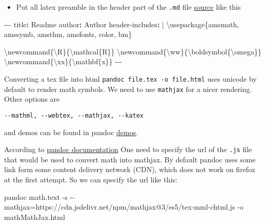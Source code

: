 \documentclass[
]{article}
\newenvironment{Shaded}{}{}
\newcommand{\AttributeTok}[1]{\textcolor[rgb]{0.49,0.56,0.16}{#1}}
\newcommand{\CharTok}[1]{\textcolor[rgb]{0.25,0.44,0.63}{#1}}
\newcommand{\ExtensionTok}[1]{#1}
\newcommand{\FunctionTok}[1]{\textcolor[rgb]{0.02,0.16,0.49}{#1}}
\newcommand{\KeywordTok}[1]{\textcolor[rgb]{0.00,0.44,0.13}{\textbf{#1}}}
\newcommand{\NormalTok}[1]{#1}
\newcommand{\OperatorTok}[1]{\textcolor[rgb]{0.40,0.40,0.40}{#1}}
\newcommand{\PreprocessorTok}[1]{\textcolor[rgb]{0.74,0.48,0.00}{#1}}
\providecommand{\tightlist}{%
  \setlength{\itemsep}{0pt}\setlength{\parskip}{0pt}}
\newcommand{\1}{\boldsymbol{1}}
\begin{document}
\begin{itemize}
\tightlist
\item
  Put all latex preamble in the header part of the \texttt{.md} file
  \href{https://pandoc.org/MANUAL.html\#extension-yaml_metadata_block}{source}
  like this
\end{itemize}

\begin{Shaded}
\begin{Highlighting}[]
\PreprocessorTok{{-}{-}{-}}
\FunctionTok{title}\KeywordTok{:}\AttributeTok{ Readme}
\FunctionTok{author}\KeywordTok{:}\AttributeTok{ Author}
\FunctionTok{header{-}includes}\KeywordTok{: }\CharTok{|}
\NormalTok{    \textbackslash{}usepackage\{amsmath, amssymb, amsthm, amsfonts, color, bm\}}

\NormalTok{    \textbackslash{}newcommand\{\textbackslash{}R\}\{\textbackslash{}mathcal\{R\}\}}
\NormalTok{    \textbackslash{}newcommand\{\textbackslash{}ww\}\{\textbackslash{}boldsymbol\{\textbackslash{}omega\}\}}
\NormalTok{    \textbackslash{}newcommand\{\textbackslash{}xx\}\{\textbackslash{}mathbf\{x\}\}}
\PreprocessorTok{{-}{-}{-}}
\end{Highlighting}
\end{Shaded}

Converting a tex file into html \texttt{pandoc\ file.tex\ -o\ file.html}
uses unicode by default to render math symbols. We need to use
\texttt{mathjax} for a nicer rendering. Other options are

\begin{verbatim}
--mathml, --webtex, --mathjax, --katex
\end{verbatim}

and demos can be found in pandoc
\href{https://pandoc.org/demos.html}{demos}.

According to
\href{https://pandoc.org/chunkedhtml-demo/3.6-math-rendering-in-html.html}{pandoc
documentation} One need to specify the url of the \texttt{.js} file that
would be used to convert math into mathjax. By default pandoc uses some
link form some content delivery network (CDN), which does not work on
firefox at the first attempt. So we can specify the url like this:

\begin{Shaded}
\begin{Highlighting}[]
\ExtensionTok{pandoc}\NormalTok{ math.text }\AttributeTok{{-}s} \AttributeTok{{-}{-}mathjax}\OperatorTok{=}\NormalTok{https://cdn.jsdelivr.net/npm/mathjax@3/es5/tex{-}mml{-}chtml.js }\AttributeTok{{-}o}\NormalTok{   mathMathJax.html}
\end{Highlighting}
\end{Shaded}
\end{document}
